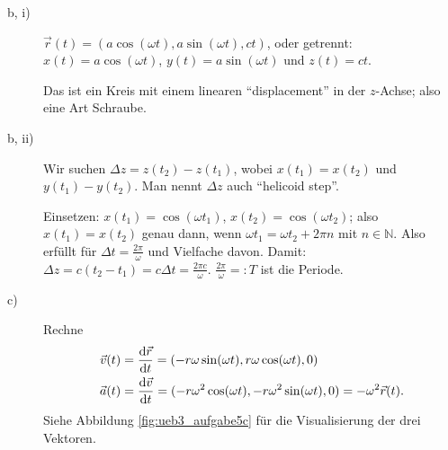 \begin{description}
	\item[b, i)] $\vec{r}(t) = (a \cos(\omega t), a \sin(\omega t), c t)$, oder getrennt: $x(t) = a \cos(\omega t)$, $y(t) = a \sin(\omega t)$ und $z(t) = ct$.
	 
	Das ist ein Kreis mit einem linearen "`displacement"' in der $z$-Achse; also eine Art Schraube.
	
	\item[b, ii)] Wir suchen $\Delta z = z(t_2) - z(t_1)$, wobei $x(t_1) = x(t_2)$ und $y(t_1) - y(t_2)$. Man nennt $\Delta z$ auch "`helicoid step"'.
	
	Einsetzen: $x(t_1) = \cos(\omega t_1)$, $x(t_2) = \cos(\omega t_2)$; also $x(t_1) = x(t_2)$ genau dann, wenn $\omega t_1 = \omega t_2 + 2 \pi n$ mit $n \in \mathbb{N}$. Also erfüllt für $\Delta t = \frac{2 \pi}{\omega}$ und Vielfache davon. Damit: $\Delta z = c (t_2 - t_1) = c \Delta t = \frac{2 \pi c}{\omega}$. $\frac{2 \pi}{\omega} =: T$ ist die Periode.
	
	\item[c)] Rechne 
	\begin{align*}
		\vec{v}(t) &= \frac{\mathrm{d}\vec{r}}{\mathrm{d}t} = (-r \omega \sin(\omega t), r \omega \cos(\omega t), 0) \\
		\vec{a}(t) &= \frac{\mathrm{d}\vec{v}}{\mathrm{d}t} = (-r \omega^2 \cos(\omega t), -r \omega^2 \sin(\omega t), 0) = -\omega^2 \vec{r}(t)
		\text{.}
	\end{align*}
	Siehe Abbildung \ref{fig:ueb3_aufgabe5c} für die Visualisierung der drei Vektoren.
	

\end{description}

